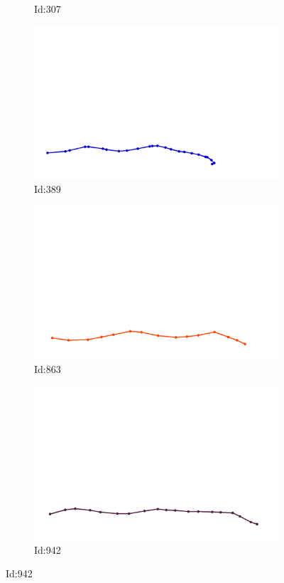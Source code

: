 \documentclass[12pt,twoside]{report}
\begin{document}
\begin{figure}
\begin{subfigure}[b]{0.20\textwidth}
\caption{Id:307}
\end{subfigure}
\begin{subfigure}[b]{0.20\textwidth}
\centering
\includegraphics[width=\textwidth]{../../trajectories/389.png}
\caption{Id:389}
\end{subfigure}
\begin{subfigure}[b]{0.20\textwidth}
\centering
\includegraphics[width=\textwidth]{../../trajectories/863.png}
\caption{Id:863}
\end{subfigure}
\begin{subfigure}[b]{0.20\textwidth}
\centering
\includegraphics[width=\textwidth]{../../trajectories/942.png}
\caption{Id:942}
\end{subfigure}
\end{figure}
\end{document}
